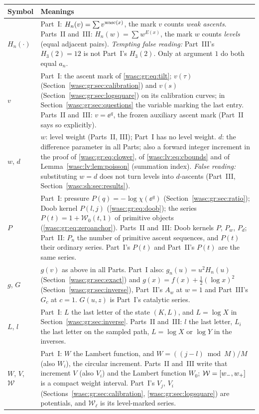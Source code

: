\documentclass[11pt,a4paper]{article}
\theoremstyle{remark}\newtheorem{remark}[theorem]{Remark}
\numberwithin{equation}{section}
\begin{document}
\begin{longtable}{@{}>{\raggedright\arraybackslash}p{} >{\raggedright\arraybackslash}p{}@{}}
\toprule
Symbol & Meanings\\
\midrule
\endhead
$H_n(\cdot)$ & Part~I: $H_n(v)=\sum v^{\operatorname{wasc}(x)}$, the mark $v$ counts \emph{weak ascents}. Parts~II and~III: $H_n(w)=\sum w^{E(x)}$, the mark $w$ counts \emph{levels} (equal adjacent pairs). \emph{Tempting false reading:} Part~III's $H_3(2)=12$ is not Part~I's $H_3(2)$. Only at argument $1$ do both equal $a_n$.\\
$v$ & Part~I: the ascent mark of \eqref{wasc:gr:eq:tilt}; $v(\tau)$ (Section~\ref{wasc:gr:sec:calibration}) and $v(s)$ (Section~\ref{wasc:gr:sec:logsquare}) on its calibration curves; in Section~\ref{wasc:gr:sec:questions} the variable marking the last entry. Parts~II and~III: $v=\ee^q$, the frozen auxiliary ascent mark (Part~II says so explicitly).\\
$w$, $d$ & $w$: level weight (Parts~II, III); Part~I has no level weight. $d$: the difference parameter in all Parts; also a forward integer increment in the proof of \eqref{wasc:gr:eq:clower}, of \eqref{wasc:lv:eq:cbounds} and of Lemma~\ref{wasc:lv:lem:poisson} (summation index). \emph{False reading:} substituting $w=d$ does not turn levels into $d$-ascents (Part~III, Section~\ref{wasc:sh:sec:results}).\\
$P$ & Part~I: pressure $P(q)=-\log\chi(\ee^q)$ (Section~\ref{wasc:gr:sec:ratio}); Doob kernel $P(l,j)$ (\eqref{wasc:gr:eq:doob}); the series $P(t)=1+\mathcal W_0(t,1)$ of primitive objects (\eqref{wasc:gr:eq:zeroanchor}). Parts~II and~III: Doob kernels $P$, $P_w$, $P_d$; Part~II: $P_n$ the number of primitive ascent sequences, and $P(t)$ their ordinary series. Part~I's $P(t)$ and Part~II's $P(t)$ are the same series.\\
$g$, $G$ & $g(v)$ as above in all Parts. Part~I also: $g_n(u)=u^2H_n(u)$ (Section~\ref{wasc:gr:sec:exact}) and $g(x)=f(x)+\frac12(\log x)^2$ (Section~\ref{wasc:gr:sec:inverse}), Part~II's $A_w$ at $w=1$ and Part~III's $G_c$ at $c=1$. $G(u,z)$ is Part~I's catalytic series.\\
$L$, $l$ & Part~I: $L$ the last letter of the state $(K,L)$, and $L=\log X$ in Section~\ref{wasc:gr:sec:inverse}. Parts~II and~III: $l$ the last letter, $L_i$ the last letter on the sampled path, $L=\log X$ or $\log Y$ in the inverses.\\
$W$, $V$, $\mathcal W$ & Part~I: $W$ the Lambert function, and $W=((j-l)\bmod M)/M$ (also $W_i$), the circular increment. Parts~II and~III write that increment $V$ (also $V_i$) and the Lambert function $W_0$; $\mathcal W=[w_-,w_+]$ is a compact weight interval. Part~I's $V_j$, $V_i$ (Sections~\ref{wasc:gr:sec:calibration}, \ref{wasc:gr:sec:logsquare}) are potentials, and $\mathcal W_\ell$ is its level-marked series.\\

\end{longtable}
\end{document}
